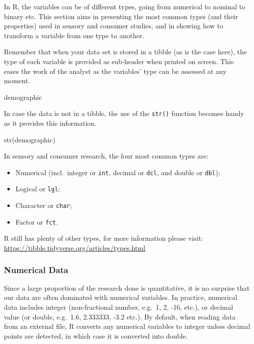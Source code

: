 \documentclass[
]{book}
\newenvironment{Shaded}{\begin{snugshade}}{\end{snugshade}}
\newcommand{\FunctionTok}[1]{\textcolor[rgb]{0.00,0.00,0.00}{#1}}
\newcommand{\NormalTok}[1]{#1}
\providecommand{\tightlist}{%
  \setlength{\itemsep}{0pt}\setlength{\parskip}{0pt}}
\begin{document}
In R, the variables can be of different types, going from numerical to nominal to binary etc. This section aims in presenting the most common types (and their properties) used in sensory and consumer studies, and in showing how to transform a variable from one type to another.

Remember that when your data set is stored in a tibble (as is the case here), the type of each variable is provided as sub-header when printed on screen. This eases the work of the analyst as the variables' type can be assessed at any moment.

\begin{Shaded}
\begin{Highlighting}[]
\NormalTok{demographic}
\end{Highlighting}
\end{Shaded}

In case the data is not in a tibble, the use of the \texttt{str()} function becomes handy as it provides this information.

\begin{Shaded}
\begin{Highlighting}[]
\FunctionTok{str}\NormalTok{(demographic)}
\end{Highlighting}
\end{Shaded}

In sensory and consumer research, the four most common types are:

\begin{itemize}
\tightlist
\item
  Numerical (incl.~integer or \texttt{int}, decimal or \texttt{dcl}, and double or \texttt{dbl});
\item
  Logical or \texttt{lgl};
\item
  Character or \texttt{char};
\item
  Factor or \texttt{fct}.
\end{itemize}

R still has plenty of other types, for more information please visit: \url{https://tibble.tidyverse.org/articles/types.html}

\hypertarget{numerical-data}{%
\subsubsection{Numerical Data}\label{numerical-data}}

Since a large proportion of the research done is quantitative, it is no surprise that our data are often dominated with numerical variables. In practice, numerical data includes integer (non-fractional number, e.g.~1, 2, -16, etc.), or decimal value (or double, e.g.~1.6, 2.333333, -3.2 etc.).
By default, when reading data from an external file, R converts any numerical variables to integer unless decimal points are detected, in which case it is converted into double.
\end{document}
